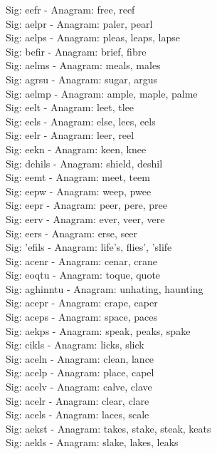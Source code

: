 Sig: {eefr} - Anagram: free, reef \\
Sig: {aelpr} - Anagram: paler, pearl \\
Sig: {aelps} - Anagram: pleas, leaps, lapse \\
Sig: {befir} - Anagram: brief, fibre \\
Sig: {aelms} - Anagram: meals, males \\
Sig: {agrsu} - Anagram: sugar, argus \\
Sig: {aelmp} - Anagram: ample, maple, palme \\
Sig: {eelt} - Anagram: leet, tlee \\
Sig: {eels} - Anagram: else, lees, eels \\
Sig: {eelr} - Anagram: leer, reel \\
Sig: {eekn} - Anagram: keen, knee \\
Sig: {dehils} - Anagram: shield, deshil \\
Sig: {eemt} - Anagram: meet, teem \\
Sig: {eepw} - Anagram: weep, pwee \\
Sig: {eepr} - Anagram: peer, pere, pree \\
Sig: {eerv} - Anagram: ever, veer, vere \\
Sig: {eers} - Anagram: erse, seer \\
Sig: {'efils} - Anagram: life's, flies', 'slife \\
Sig: {acenr} - Anagram: cenar, crane \\
Sig: {eoqtu} - Anagram: toque, quote \\
Sig: {aghinntu} - Anagram: unhating, haunting \\
Sig: {acepr} - Anagram: crape, caper \\
Sig: {aceps} - Anagram: space, paces \\
Sig: {aekps} - Anagram: speak, peaks, spake \\
Sig: {cikls} - Anagram: licks, slick \\
Sig: {aceln} - Anagram: clean, lance \\
Sig: {acelp} - Anagram: place, capel \\
Sig: {acelv} - Anagram: calve, clave \\
Sig: {acelr} - Anagram: clear, clare \\
Sig: {acels} - Anagram: laces, scale \\
Sig: {aekst} - Anagram: takes, stake, steak, keats \\
Sig: {aekls} - Anagram: slake, lakes, leaks \\
